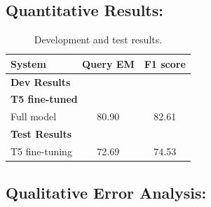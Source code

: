 \documentclass{article}
\begin{document}
\subsection*{Quantitative Results:} 
\begin{table}[h!]
\centering
\begin{tabular}{lcc}
  \toprule
  System & Query EM & F1 score\\
  \midrule
  \multicolumn{3}{l}{\textbf{Dev Results}} \\
  \midrule
  
  \multicolumn{3}{l}{\textbf{T5 fine-tuned}} \\
  Full model & 80.90 & 82.61 \\[5pt]
  
  \midrule
  \multicolumn{3}{l}{\textbf{Test Results}} \\
  \midrule
  T5 fine-tuning & 72.69 & 74.53 \\
  \bottomrule
\end{tabular}  
\caption{Development and test results.}
\label{tab:results}
\end{table}


\subsection*{Qualitative Error Analysis:} 
\end{document}
